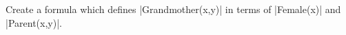 \item {}
Create a formula which defines |Grandmother(x,y)| in terms of |Female(x)| and
|Parent(x,y)|.
